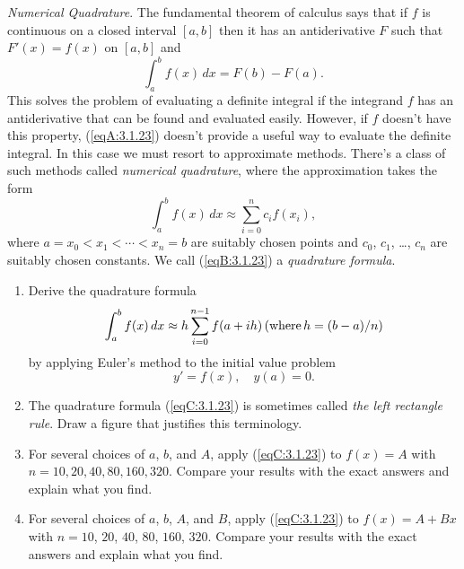 \documentclass{ximera}
\begin{document}
\begin{problem}\label{exer:3.1.23}
\emph{Numerical Quadrature}.
The fundamental theorem of  calculus says that if $f$
is continuous on a closed interval $[a,b]$ then it has an
antiderivative $F$ such that $F'(x)=f(x)$ on $[a,b]$  and
\begin{equation}\label{eqA:3.1.23}
\int_a^bf(x)\,dx=F(b)-F(a).
\end{equation}
This solves the problem of evaluating a definite integral if
the integrand $f$ has an antiderivative that can be found and
evaluated easily. However, if $f$
doesn't have this property,  (\ref{eqA:3.1.23}) doesn't  provide a useful
way to evaluate the definite integral. In this case we must resort to
approximate methods. There's a class of such methods called
\emph{numerical quadrature}, where the approximation takes the
form
\begin{equation}\label{eqB:3.1.23}
\int_a^bf(x)\,dx\approx \sum_{i=0}^n c_if(x_i),
\end{equation}
where $a=x_0<x_1<\cdots<x_n=b$ are suitably chosen points and
$c_0$, $c_1$, \dots, $c_n$
are suitably chosen constants. We call (\ref{eqB:3.1.23})  a \emph{quadrature formula}.
\begin{enumerate}
\item %
Derive the quadrature formula
\begin{equation}\label{eqC:3.1.23}
\int_a^bf(x)\,dx\approx
h\sum_{i=0}^{n-1}f(a+ih)\mbox{\,(where}\, h=(b-a)/n)
\end{equation}
by applying Euler's method to the initial value problem
$$
y'=f(x),\quad y(a)=0.
$$
\item %
The quadrature formula (\ref{eqC:3.1.23}) is sometimes called \emph{the left rectangle rule}. Draw a figure that justifies this terminology.
\item %
For several choices of $a$, $b$, and $A$,
 apply (\ref{eqC:3.1.23}) to $f(x)=A$ with $n = 10,20,40,80,160,320$.
Compare your results with the exact answers
and explain what you find.
\item %
For several choices of $a$, $b$,  $A$, and $B$,
 apply (\ref{eqC:3.1.23}) to $f(x)=A+Bx$ with $n=10$, $20$, $40$, $80$, $160$, $320$.
 Compare your results with the exact answers
and explain what you find.
\end{enumerate}
\end{problem}
\end{document}
